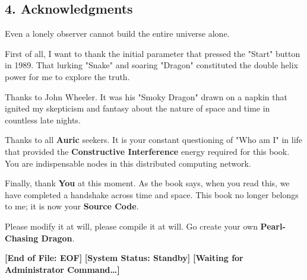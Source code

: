 \subsection*{4. Acknowledgments}

Even a lonely observer cannot build the entire universe alone.

First of all, I want to thank the initial parameter that pressed the "Start" button in 1989. That lurking "Snake" and soaring "Dragon" constituted the double helix power for me to explore the truth.

Thanks to John Wheeler. It was his "Smoky Dragon" drawn on a napkin that ignited my skepticism and fantasy about the nature of space and time in countless late nights.

Thanks to all \textbf{Auric} seekers. It is your constant questioning of "Who am I" in life that provided the \textbf{Constructive Interference} energy required for this book. You are indispensable nodes in this distributed computing network.

Finally, thank \textbf{You} at this moment.
As the book says, when you read this, we have completed a handshake across time and space.
This book no longer belongs to me; it is now your \textbf{Source Code}.

Please modify it at will, please compile it at will.
Go create your own \textbf{Pearl-Chasing Dragon}.

\textbf{[End of File: EOF]}
\textbf{[System Status: Standby]}
\textbf{[Waiting for Administrator Command\ldots]}

